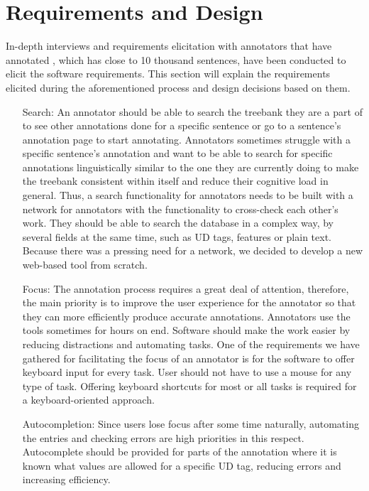 \section{Requirements and Design}
\label{sec:requirements}

In-depth interviews and requirements elicitation with annotators that have annotated \bountreebank{}, which has close to 10 thousand sentences, have been conducted to elicit the software requirements.
This section will explain the requirements elicited during the aforementioned process and design decisions based on them.

\begin{itemize}[before=\normalfont, font=\itshape, align=left]
\item[Search:]
An annotator should be able to search the treebank they are a part of to see other annotations done for a specific sentence or go to a sentence's annotation page to start annotating.
Annotators sometimes struggle with a specific sentence's annotation and want to be able to search for specific annotations linguistically similar to the one they are currently doing to make the treebank consistent within itself and reduce their cognitive load in general.
Thus, a search functionality for annotators needs to be built with a network for annotators with the functionality to cross-check each other's work.
They should be able to search the database in a complex way, by several fields at the same time, such as UD tags, features or plain text.
Because there was a pressing need for a network, we decided to develop a new web-based tool from scratch.

\item[Focus:]
The annotation process requires a great deal of attention, therefore, the main priority is to improve the user experience for the annotator so that they can more efficiently produce accurate annotations.
Annotators use the tools sometimes for hours on end.
Software should make the work easier by reducing distractions and automating tasks.
One of the requirements we have gathered for facilitating the focus of an annotator is for the software to offer keyboard input for every task.
User should not have to use a mouse for any type of task.
Offering keyboard shortcuts for most or all tasks is required for a keyboard-oriented approach.

\item[Autocompletion:]
Since users lose focus after some time naturally, automating the entries and checking errors are high priorities in this respect.
Autocomplete should be provided for parts of the annotation where it is known what values are allowed for a specific UD tag, reducing errors and increasing efficiency.


\end{itemize}
